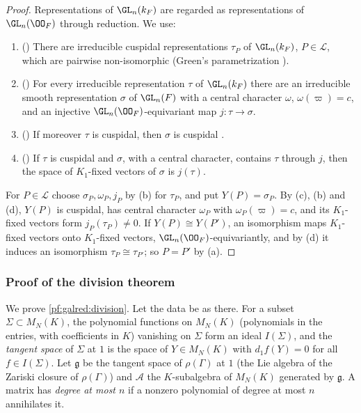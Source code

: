 \begin{proof}
Representations of $\GL_n(k_F)$ are regarded as representations of $\GL_n(\OO_F)$ through reduction. We use:
\begin{enumerate}[label=(\alph*),nosep]
\item () There are irreducible cuspidal representations $\tau_P$ of
  $\GL_n(k_F)$, $P\in\mathcal L$, which are pairwise non-isomorphic (Green's parametrization \cite{Green1955}).
\item () For every irreducible representation $\tau$ of $\GL_n(k_F)$ there are an
  irreducible smooth representation $\sigma$ of $\GL_n(F)$ with a central character $\omega$, $\omega(\varpi)=c$, and an
  injective $\GL_n(\OO_F)$-equivariant map $j\colon\tau\to\sigma$.
\item () If moreover $\tau$ is cuspidal, then $\sigma$ is cuspidal
  \cite{MoyPrasad1996}.
\item () If $\tau$ is cuspidal and $\sigma$, with a central character,
  contains $\tau$ through $j$, then the space of $K_1$-fixed vectors of $\sigma$ is $j(\tau)$.
\end{enumerate}
For $P\in\mathcal L$ choose $\sigma_P,\omega_P,j_P$ by (b) for $\tau_P$, and put $Y(P)=\sigma_P$. By (c), (b) and (d),
$Y(P)$ is cuspidal, has central character $\omega_P$ with $\omega_P(\varpi)=c$, and its $K_1$-fixed vectors form
$j_P(\tau_P)\ne0$. If $Y(P)\cong Y(P')$, an isomorphism maps $K_1$-fixed vectors onto $K_1$-fixed vectors,
$\GL_n(\OO_F)$-equivariantly, and by (d) it induces an isomorphism $\tau_P\cong\tau_{P'}$; so $P=P'$ by (a).
\end{proof}

\subsubsection{Proof of the division theorem}\label{sec:pf:galred:divproof}

We prove \cref{pf:galred:division}. Let the data be as there. For a subset $\Sigma\subset M_N(K)$, the polynomial functions
on $M_N(K)$ (polynomials in the entries, with coefficients in $K$) vanishing on $\Sigma$ form an ideal $I(\Sigma)$, and the
\emph{tangent space} of $\Sigma$ at $1$ is the space of $Y\in M_N(K)$ with $d_1f(Y)=0$ for all $f\in I(\Sigma)$. Let
$\mathfrak g$ be the tangent space of $\rho(\Gamma)$ at $1$ (the Lie algebra of the Zariski closure of $\rho(\Gamma)$) and
$\mathcal A$ the $K$-subalgebra of $M_N(K)$ generated by $\mathfrak g$. A matrix has \emph{degree at most $n$} if a
nonzero polynomial of degree at most $n$ annihilates it.

